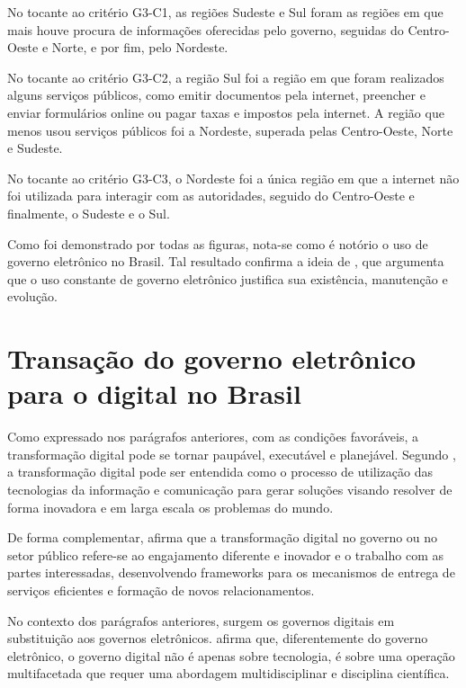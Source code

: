 No tocante ao critério G3-C1, as regiões Sudeste e Sul foram as regiões em que mais houve procura de informações oferecidas pelo governo, seguidas do Centro-Oeste e Norte, e por fim, pelo Nordeste.

No tocante ao critério G3-C2, a região Sul foi a região em que foram realizados alguns serviços públicos, como emitir documentos pela internet, preencher e enviar formulários online ou pagar taxas e impostos pela internet. A região que menos usou serviços públicos foi a Nordeste, superada pelas Centro-Oeste, Norte e Sudeste.

No tocante ao critério G3-C3, o Nordeste foi a única região em que a internet não foi utilizada para interagir com as autoridades, seguido do Centro-Oeste e finalmente, o Sudeste e o Sul.

Como foi demonstrado por todas as figuras, nota-se como é notório o uso de governo eletrônico no Brasil. Tal resultado confirma a ideia de \cite{singh2007country}, que argumenta que o uso constante de governo eletrônico justifica sua existência, manutenção e evolução.

\section{Transação do governo eletrônico para o digital no Brasil}

Como expressado nos parágrafos anteriores, com as condições favoráveis, a transformação digital pode se tornar paupável, executável e planejável. Segundo \cite{mitkiewicz2024transformaccao}, a transformação digital pode ser entendida como o processo de utilização das tecnologias da informação e comunicação para gerar soluções visando resolver de forma inovadora e em larga escala os problemas do mundo.

De forma complementar, \cite{alenezi2022understanding} afirma que a transformação digital no governo ou no setor público refere-se ao engajamento diferente e inovador e o trabalho com as partes interessadas, desenvolvendo frameworks para os mecanismos de entrega de serviços eficientes e formação de novos relacionamentos.

No contexto dos parágrafos anteriores, surgem os governos digitais em substituição aos governos eletrônicos. \cite{veiga2016digital} afirma que, diferentemente do governo eletrônico, o governo digital não é apenas sobre tecnologia, é sobre uma operação multifacetada  que requer uma abordagem multidisciplinar e disciplina científica. 

